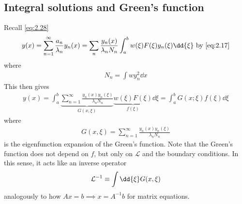 \subsection{Integral solutions and Green's function}
Recall \cref{eq:2.28}
\begin{align*}
    y(x) = \sum_{n=1}^\infty \frac{a_n}{\lambda_n} y_n(x) = \sum_n \frac{y_n(x)}{\lambda_n N_n} \int_a^b w(\xi) F(\xi) y_n(\xi) \dd{\xi} \text{ by \cref{eq:2.17}}
\end{align*}
where
\begin{align*}
    N_n = \int w y_n^2 \dd{x}
\end{align*}
This then gives
\begin{align*}
    y(x) = \int_a^b \underbrace{\sum_{n=1}^\infty \frac{y_n(x) y_n(\xi)}{\lambda_n N_n}}_{G(x,\xi)} \underbrace{w(\xi) F(\xi)}_{f(\xi)} \dd{\xi} = \int_a^b G(x;\xi) f(\xi) \dd{\xi}
\end{align*}
where
\begin{align*}
    G(x,\xi) = \sum_{n=1}^\infty \frac{y_n(x) y_n(\xi)}{\lambda_n N_n}
\end{align*}
is the eigenfunction expansion of the Green's function.
Note that the Green's function does not depend on $f$, but only on $\mathcal L$ and the boundary conditions.
In this sense, it acts like an inverse operator
\begin{align*}
    \mathcal L\inv \equiv \int \dd{\xi} G(x,\xi)
\end{align*}
analogously to how $Ax = b \implies x = A^{-1} b$ for matrix equations.